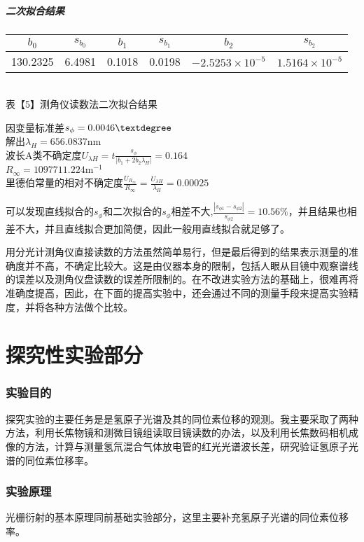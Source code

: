 \documentclass[8pt,a4paper,nocap]{ctexart}
\begin{document}
\subsubsection{二次拟合结果}
\begin{center}
	\begin{tabular}{|c|c|c|c|c|c|} \hline
		\(b_0\) & \(s_{b_0}\) & \(b_1\) & \(s_{b_1}\) &\(b_2\) & \(s_{b_2}\) \\ \hline
		130.2325 & 6.4981 & 0.1018 & 0.0198 & \(-2.5253\times10^{-5}\) & \(1.5164\times10^{-5}\)\\ \hline
	\end{tabular}\\
		{\footnotesize 表【5】测角仪读数法二次拟合结果}
\end{center}
因变量标准差\(s_\phi = 0.0046\textdegree\)\\
解出\(\lambda_H = 656.0837\mathrm{nm}\)\\
波长A类不确定度\(\displaystyle U_{\lambda H} = t\frac{s_\phi}{|b_1 + 2b_2\lambda_H|} = 0.164\)\\
\(\displaystyle R_\infty = 1097711.224 \mathrm{m}^{-1}\)\\
里德伯常量的相对不确定度\(\displaystyle \frac{U_{R_\infty}}{R_\infty} = \frac{U_{\lambda H}}{\lambda_H} =0.00025\)

可以发现直线拟合的\(s_\phi\)和二次拟合的\(s_\phi\)相差不大,\(\displaystyle \frac{|s_{\phi1} - s_{\phi2}|}{s_{\phi2}} = 10.56 \%\)，并且结果也相差不大，并且直线拟合更加简便，因此一般用直线拟合就足够了。

用分光计测角仪直接读数的方法虽然简单易行，但是最后得到的结果表示测量的准确度并不高，不确定比较大。这是由仪器本身的限制，包括人眼从目镜中观察谱线的误差以及测角仪盘读数的误差所限制的。在不改进实验方法的基础上，很难再将准确度提高，因此，在下面的提高实验中，还会通过不同的测量手段来提高实验精度，并将各种方法做个比较。
\part{探究性实验部分}
\section{实验目的}
探究实验的主要任务是是氢原子光谱及其的同位素位移的观测。我主要采取了两种方法，利用长焦物镜和测微目镜组读取目镜读数的办法，以及利用长焦数码相机成像的方法，计算与测量氢氘混合气体放电管的红光光谱波长差，研究验证氢原子光谱的同位素位移率。
\section{实验原理}
光栅衍射的基本原理同前基础实验部分，这里主要补充氢原子光谱的同位素位移率。
\end{document}

